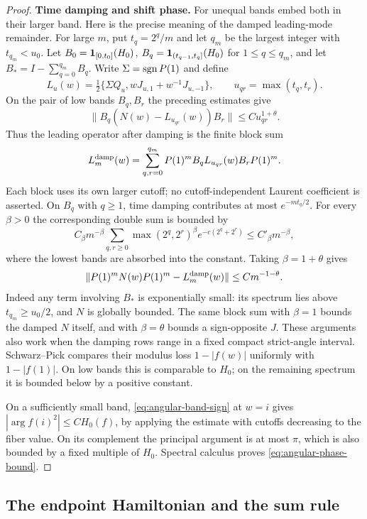 \begin{proof}
\smallskip\noindent\textbf{Time damping and shift phase.}
For unequal bands embed both in their larger band. Here is the precise
meaning of the damped leading-mode remainder. For large $m$, put
$t_q=2^q/m$ and let $q_m$ be the largest integer with $t_{q_m}<u_0$.
Let $B_0=\mathbf1_{[0,t_0]}(H_0)$,
$B_q=\mathbf1_{(t_{q-1},t_q]}(H_0)$ for $1\le q\le q_m$, and let
$B_*=I-\sum_{q=0}^{q_m}B_q$. Write $\Sigma=\operatorname{sgn} P(1)$ and define
\[
 L_u(w)=\tfrac12\{\Sigma Q_u,
                       wJ_{u,1}+w^{-1}J_{u,-1}\},\qquad
 u_{qr}=\max(t_q,t_r).
\]
On the pair of low bands $B_q,B_r$ the preceding estimates give
\[
 \|B_q(N(w)-L_{u_{qr}}(w))B_r\|
                         \le C u_{qr}^{1+\theta}.
\]
Thus the leading operator after damping is the finite block sum
\[
 L_m^{\rm damp}(w)
 =\sum_{q,r=0}^{q_m}P(1)^m B_q L_{u_{qr}}(w) B_rP(1)^m.
\]
Each block uses its own larger cutoff; no cutoff-independent Laurent
coefficient is asserted. On $B_q$ with $q\ge1$, time damping contributes
at most $e^{-mt_q/2}$. For every $\beta>0$ the corresponding double
sum is bounded by
\[
 C_\beta m^{-\beta}
 \sum_{q,r\ge0}\max(2^q,2^r)^\beta
                  e^{-c(2^q+2^r)}
 \le C'_\beta m^{-\beta},
\]
where the lowest bands are absorbed into the constant. Taking
$\beta=1+\theta$ gives
\[
 \|P(1)^mN(w)P(1)^m-L_m^{\rm damp}(w)\|
                            \le C m^{-1-\theta}.
\]
Indeed any term involving $B_*$ is exponentially small: its spectrum
lies above $t_{q_m}\ge u_0/2$, and $N$ is globally bounded. The same
block sum with $\beta=1$ bounds the damped $N$ itself, and with
$\beta=\theta$ bounds a sign-opposite $J$. These arguments also work
when the damping rows range in a fixed compact strict-angle interval.
Schwarz--Pick compares their modulus loss $1-|f(w)|$ uniformly with
$1-|f(1)|$. On low bands this is comparable to $H_0$; on the
remaining spectrum it is bounded below by a positive constant.

On a sufficiently small band, \eqref{eq:angular-band-sign} at $w=i$
gives $|\arg f(i)^2|\le C H_0(f)$, by applying the estimate with
cutoffs decreasing to the fiber value.  On its complement the principal
argument is at most $\pi$, which is also bounded by a fixed multiple
of $H_0$.  Spectral calculus proves
\eqref{eq:angular-phase-bound}.
\end{proof}

\subsection{The endpoint Hamiltonian and the sum rule}

